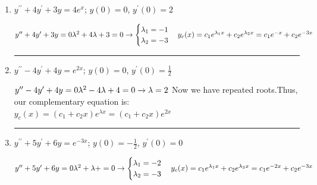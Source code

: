 \documentclass[fleqn]{article}
\begin{document}
\begin{enumerate}
      \begin{enumerate}
      \item $y^{\prime \prime }+4y^{\prime }+3y=4e^{x}$; $y\left( 0\right) =0$, $y^{\prime }\left( 0\right) =2$

        \textcolor{hwColor}{
          $
            y^{\prime \prime }+4y^{\prime }+3y=0 \\
            \\
            \lambda^2+4\lambda+3=0 \rightarrow \begin{cases}
              \lambda_1=-1 \\
              \lambda_2=-3
            \end{cases} \\
            \\
            y_c(x)=c_1e^{\lambda_1 x}+c_2e^{\lambda_2 x}=c_1e^{-x}+c_2e^{-3 x}
          $
        }

        \textcolor{hwColor}{ 
          \rule{15cm}{1pt} 
        }
      
      \item $y^{\prime \prime }-4y^{\prime }+4y=e^{2x}$; $y\left( 0\right) =0$, $y^{\prime }\left( 0\right) =\frac{1}{2}$
      
        \textcolor{hwColor}{
          $
            y^{\prime \prime }-4y^{\prime }+4y=0 \\
            \\
            \lambda^2-4\lambda+4=0 \rightarrow \lambda=2
          $
          Now we have repeated roots.Thus, our complementary equation is: \\
          $ 
            y_c(x)=(c_1+c_2 x)e^{\lambda x}=(c_1+c_2 x)e^{2x}
          $
        }

        \textcolor{hwColor}{ 
          \rule{15cm}{1pt} 
        }

      \item $y^{\prime \prime }+5y^{\prime }+6y=e^{-3x}$; $y\left( 0\right) =-\frac{1}{2}$, $y^{\prime }\left( 0\right) =0$
      
        \textcolor{hwColor}{
          $
            y^{\prime \prime }+5y^{\prime }+6y=0 \\
            \\
            \lambda^2+\lambda+=0 \rightarrow \begin{cases}
              \lambda_1=-2 \\
              \lambda_2=-3
            \end{cases} \\
            \\
            y_c(x)=c_1e^{\lambda_1 x}+c_2e^{\lambda_2 x}=c_1e^{-2x}+c_2e^{-3x}
          $
        }


\end{enumerate}
\end{enumerate}
\end{document}
